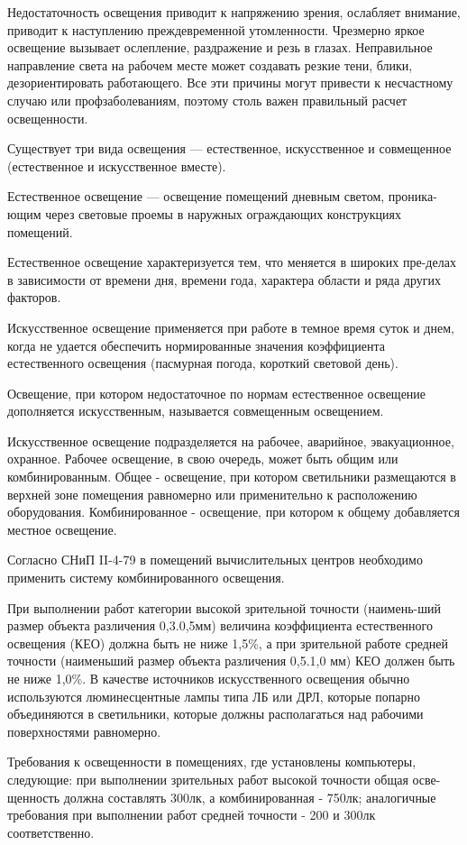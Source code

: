 Недостаточность освещения приводит к напряжению зрения, ослабляет внимание, приводит к наступлению преждевременной утомленности. Чрезмерно яркое освещение вызывает ослепление, раздражение и резь в глазах. Неправильное направление света на рабочем месте может создавать резкие тени, блики, дезориентировать работающего. Все эти причины могут привести к несчастному случаю или профзаболеваниям, поэтому столь важен правильный расчет освещенности.

Существует три вида освещения --- естественное, искусственное и совмещенное (естественное и искусственное вместе).

Естественное освещение --- освещение помещений дневным светом, проника-ющим через световые проемы в наружных ограждающих конструкциях помещений.

Естественное освещение характеризуется тем, что меняется в широких пре-делах в зависимости от времени  дня, времени года, характера области и ряда других факторов.

Искусственное освещение применяется при работе в темное время суток и днем, когда не удается обеспечить нормированные значения коэффициента естественного освещения (пасмурная погода, короткий световой день).

Освещение, при котором недостаточное по нормам естественное освещение дополняется искусственным, называется совмещенным освещением.

Искусственное освещение подразделяется на рабочее, аварийное, эвакуационное, охранное. Рабочее освещение, в свою очередь, может быть общим или комбинированным. Общее - освещение, при котором светильники размещаются в верхней зоне помещения равномерно или применительно к расположению оборудования. Комбинированное - освещение, при котором к общему добавляется местное освещение.

Согласно СНиП II-4-79 в помещений вычислительных центров необходимо применить систему комбинированного освещения.

При выполнении работ категории высокой зрительной точности (наимень-ший размер объекта различения 0,3.0,5мм) величина коэффициента естественного освещения (КЕО) должна быть не ниже 1,5\%, а при зрительной работе средней точности (наименьший размер объекта различения 0,5.1,0 мм) КЕО должен быть не ниже 1,0\%. В качестве источников искусственного освещения обычно используются люминесцентные лампы типа ЛБ или ДРЛ, которые попарно объединяются в светильники, которые должны располагаться над рабочими поверхностями равномерно.

Требования к освещенности в помещениях, где установлены компьютеры, следующие: при выполнении зрительных работ высокой точности общая осве-щенность должна составлять 300лк, а комбинированная - 750лк; аналогичные требования при выполнении работ средней точности - 200 и 300лк соответственно.

